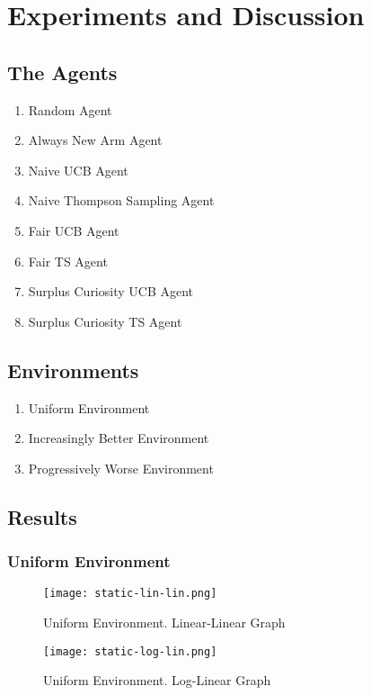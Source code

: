 \section{Experiments and Discussion}
 
\subsection{The Agents}

\begin{enumerate}
    \item Random Agent
    \item Always New Arm Agent
    \item Naive UCB Agent
    \item Naive Thompson Sampling Agent
    \item Fair UCB Agent
    \item Fair TS Agent
    \item Surplus Curiosity UCB Agent
    \item Surplus Curiosity TS Agent
\end{enumerate}

\subsection{Environments}

\begin{enumerate}
    \item Uniform Environment
    \item Increasingly Better Environment
    \item Progressively Worse Environment
\end{enumerate}

\subsection{Results}

\subsubsection{Uniform Environment}
\begin{figure}[ht]
    \centering
    \texttt{[image: static-lin-lin.png]}
    \caption{Uniform Environment. Linear-Linear Graph}
    \label{fig:fn}
\end{figure}

\begin{figure}[ht]
    \centering
    \texttt{[image: static-log-lin.png]}
    \caption{Uniform Environment. Log-Linear Graph}
    \label{fig:fn}
\end{figure}

